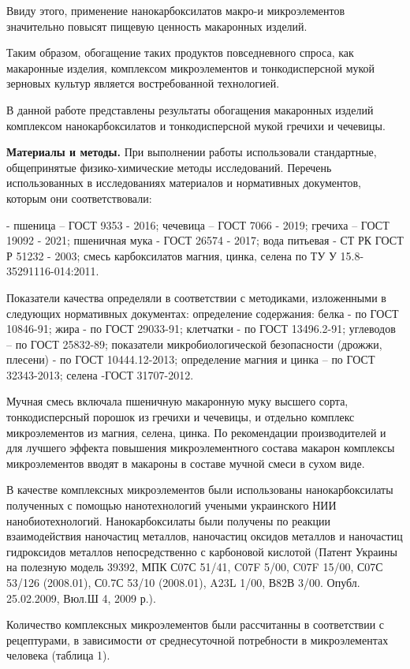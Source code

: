 Ввиду этого, применение нанокарбоксилатов макро-и микроэлементов
значительно повысят пищевую ценность макаронных изделий.

Таким образом, обогащение таких продуктов повседневного спроса, как
макаронные изделия, комплексом микроэлементов и тонкодисперсной мукой
зерновых культур является востребованной технологией.

В данной работе представлены результаты обогащения макаронных изделий
комплексом нанокарбоксилатов и тонкодисперсной мукой гречихи и чечевицы.

{\bfseries Материалы и методы.} При выполнении работы использовали
стандартные, общепринятые физико-химические методы исследований.
Перечень использованных в исследованиях материалов и нормативных
документов, которым они соответствовали:

- пшеница -- ГОСТ 9353 - 2016; чечевица -- ГОСТ 7066 - 2019; гречиха --
ГОСТ 19092 - 2021; пшеничная мука - ГОСТ 26574 - 2017; вода питьевая -
СТ РК ГОСТ Р 51232 - 2003; смесь карбоксилатов магния, цинка, селена по
ТУ У 15.8-35291116-014:2011.

Показатели качества определяли в соответствии с методиками, изложенными
в следующих нормативных документах: определение содержания: белка - по
ГОСТ 10846-91; жира - по ГОСТ 29033-91; клетчатки - по ГОСТ 13496.2-91;
углеводов -- по ГОСТ 25832-89; показатели микробиологической
безопасности (дрожжи, плесени) - по ГОСТ 10444.12-2013; определение
магния и цинка -- по ГОСТ 32343-2013; селена -ГОСТ 31707-2012.

Мучная смесь включала пшеничную макаронную муку высшего сорта,
тонкодисперсный порошок из гречихи и чечевицы, и отдельно комплекс
микроэлементов из магния, селена, цинка. По рекомендации производителей
и для лучшего эффекта повышения микроэлементного состава макарон
комплексы микроэлементов вводят в макароны в составе мучной смеси в
сухом виде.

В качестве комплексных микроэлементов были использованы нанокарбоксилаты
полученных с помощью нанотехнологий учеными украинского НИИ
нанобиотехнологий. Нанокарбоксилаты были получены по реакции
взаимодействия наночастиц металлов, наночастиц оксидов металлов и
наночастиц гидроксидов металлов непосредственно с карбоновой кислотой
(Патент Украины на полезную модель 39392, МПК С07С 51/41, C07F 5/00,
C07F 15/00, С07С 53/126 (2008.01), С0.7С 53/10 (2008.01), A23L 1/00,
В82В 3/00. Опубл. 25.02.2009, Вюл.Ш 4, 2009 р.).

Количество комплексных микроэлементов были рассчитанны в соответствии с
рецептурами, в зависимости от среднесуточной потребности в
микроэлементах человека (таблица 1).


